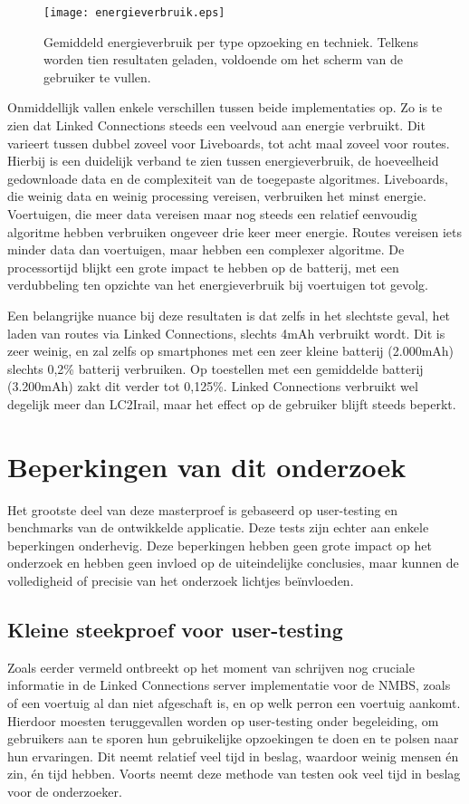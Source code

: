 \begin{figure}[ht]
	\centering
	\texttt{[image: energieverbruik.eps]}
	\caption[Energieverbruik per opzoeking]{Gemiddeld energieverbruik per type opzoeking en techniek. Telkens worden tien resultaten geladen, voldoende om het scherm van de gebruiker te vullen.}
	\label{fig:batteryUsage}
\end{figure}

Onmiddellijk vallen enkele verschillen tussen beide implementaties op. Zo is te zien dat Linked Connections steeds een veelvoud aan energie verbruikt. Dit varieert tussen dubbel zoveel voor Liveboards, tot acht maal zoveel voor routes. Hierbij is een duidelijk verband te zien tussen energieverbruik, de hoeveelheid gedownloade data en de complexiteit van de toegepaste algoritmes.
Liveboards, die weinig data en weinig processing vereisen, verbruiken het minst energie. Voertuigen, die meer data vereisen maar nog steeds een relatief eenvoudig algoritme hebben verbruiken ongeveer drie keer meer energie. Routes vereisen iets minder data dan voertuigen,  maar hebben een complexer algoritme. De processortijd blijkt een grote impact te hebben op de batterij, met een verdubbeling ten opzichte van het energieverbruik bij voertuigen tot gevolg.

Een belangrijke nuance bij deze resultaten is dat zelfs in het slechtste geval, het laden van routes via Linked Connections, slechts 4mAh verbruikt wordt. Dit is zeer weinig, en zal zelfs op smartphones met een zeer kleine batterij (2.000mAh) slechts 0,2\% batterij verbruiken. Op toestellen met een gemiddelde batterij (3.200mAh) zakt dit verder tot 0,125\%. Linked Connections verbruikt wel degelijk meer dan LC2Irail, maar het effect op de gebruiker blijft steeds beperkt.

\section{Beperkingen van dit onderzoek}
\label{sec:beperkingen}

Het grootste deel van deze masterproef is gebaseerd op user-testing en benchmarks van de ontwikkelde applicatie. Deze tests zijn echter aan enkele beperkingen onderhevig. Deze beperkingen hebben geen grote impact op het onderzoek en hebben geen invloed op de uiteindelijke conclusies, maar kunnen de volledigheid of precisie van het onderzoek lichtjes beïnvloeden.

\subsection{Kleine steekproef voor user-testing}
Zoals eerder vermeld ontbreekt op het moment van schrijven nog cruciale informatie in de Linked Connections server implementatie voor de NMBS, zoals of een voertuig al dan niet afgeschaft is, en op welk perron een voertuig aankomt. Hierdoor moesten teruggevallen worden op user-testing onder begeleiding, om gebruikers aan te sporen hun gebruikelijke opzoekingen te doen en te polsen naar hun ervaringen. Dit neemt relatief veel tijd in beslag, waardoor weinig mensen én zin, én tijd hebben. Voorts neemt deze methode van testen ook veel tijd in beslag voor de onderzoeker. 

